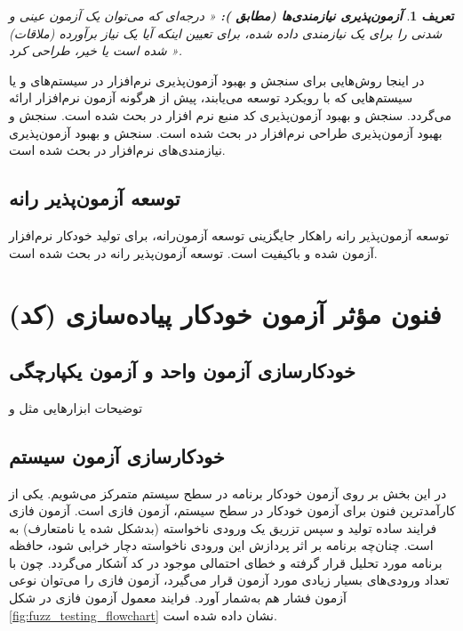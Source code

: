 \documentclass[a4paper,12pt]{article}
\newtheorem{definition}{تعریف}[section]
\begin{document}
\begin{definition}\label{def:requirements-testability}
\textbf{
 آزمون‌پذیری نیازمندی‌ها (مطابق
 \cite{ISO/IEC/IEEE/24765:2017}):
}
«%
{\textit{%
درجه‌ای که می‌توان یک آزمون عینی و شدنی را برای یک نیازمندی داده شده، برای تعیین اینکه آیا یک نیاز برآورده (ملاقات) شده است یا خیر، طراحی کرد%
}}».
\end{definition}

در اینجا روش‌هایی برای سنجش و بهبود آزمون‌پذیری نرم‌افزار در سیستم‌های 
و یا سیستم‌هایی که با رویکرد 
توسعه می‌یابند،
پیش از هرگونه آزمون نرم‌افزار ارائه می‌گردد. 
  سنجش و بهبود آزمون‌پذیری کد منبع نرم افزار در 
\cite{Zakeri20232}
بحث شده است.
سنجش و بهبود آزمون‌پذیری طراحی نرم‌افزار در 
\cite{Zakeri20244}
بحث شده است.
سنجش و بهبود آزمون‌پذیری نیازمندی‌های نرم‌افزار در 
\cite{Zakeri20243}
بحث شده است.


\subsection{توسعه آزمون‌پذیر رانه}
توسعه آزمون‌پذیر رانه راهکار جایگزینی
توسعه آزمون‌رانه،
 برای تولید خودکار نرم‌افزار آزمون شده و باکیفیت است. 
توسعه آزمون‌پذیر رانه در 
\cite{Parsa2025}
بحث شده است.


\section{
فنون مؤثر آزمون خودکار پیاده‌سازی (کد)
}\label{sec:automated-testing}

\subsection{
  خودکارسازی آزمون واحد و آزمون‌ یکپارچگی
}
توضیحات ابزارهایی مثل 
و 


\subsection{
خودکارسازی آزمون ‌سیستم
}
در این بخش بر روی آزمون خودکار برنامه در سطح سیستم متمرکز می‌شویم. 
یکی از کارآمدترین فنون برای آزمون خودکار در سطح سیستم، آزمون فازی است.
آزمون فازی فرایند ساده تولید و سپس تزریق یک ورودی ناخواسته (بدشکل شده یا نامتعارف) به 
است. چنان‌چه برنامه بر اثر پردازش این ورودی ناخواسته دچار خرابی شود، حافظه برنامه مورد تحلیل قرار گرفته و خطای احتمالی موجود در کد آشکار می‌گردد. چون  با تعداد ورودی‌های بسیار زیادی مورد آزمون قرار می‌گیرد، آزمون فازی را می‌توان نوعی آزمون فشار هم به‌شمار آورد. فرایند معمول آزمون فازی در ‏شکل
\ref{fig:fuzz_testing_flowchart} 
نشان داده شده است.
\end{document}
